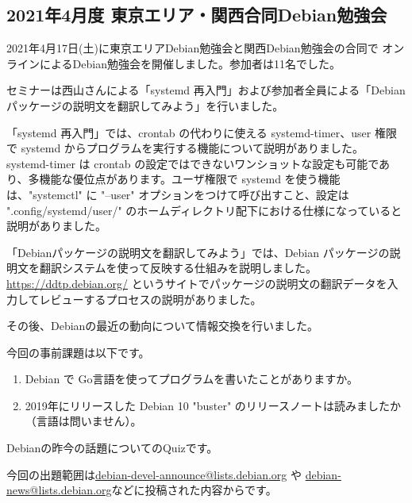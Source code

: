 \documentclass[mingoth,a4paper]{jsarticle}
\begin{document}

\subsection{2021年4月度 東京エリア・関西合同Debian勉強会}

2021年4月17日(土)に東京エリアDebian勉強会と関西Debian勉強会の合同で
オンラインによるDebian勉強会を開催しました。参加者は11名でした。

セミナーは西山さんによる「systemd 再入門」および参加者全員による「Debianパッケージの説明文を翻訳してみよう」を行いました。

「systemd 再入門」では、crontab の代わりに使える systemd-timer、user 権限で systemd からプログラムを実行する機能について説明がありました。systemd-timer は crontab の設定ではできないワンショットな設定も可能であり、多機能な優位点があります。ユーザ権限で systemd を使う機能は、"systemctl" に "--user" オプションをつけて呼び出すこと、設定は ".config/systemd/user/" のホームディレクトリ配下における仕様になっていると説明がありました。

「Debianパッケージの説明文を翻訳してみよう」では、Debian パッケージの説明文を翻訳システムを使って反映する仕組みを説明しました。\url{https://ddtp.debian.org/} というサイトでパッケージの説明文の翻訳データを入力してレビューするプロセスの説明がありました。

その後、Debianの最近の動向について情報交換を行いました。


今回の事前課題は以下です。

\begin{enumerate}
 \item Debian で Go言語を使ってプログラムを書いたことがありますか。
 \item 2019年にリリースした Debian 10 "buster" のリリースノートは読みましたか（言語は問いません）。
\end{enumerate}


\begin{multicols}{2}
{\small
  
}
\end{multicols}


Debianの昨今の話題についてのQuizです。

今回の出題範囲は\url{debian-devel-announce@lists.debian.org} や \url{debian-news@lists.debian.org}などに投稿された内容からです。
\end{document}
